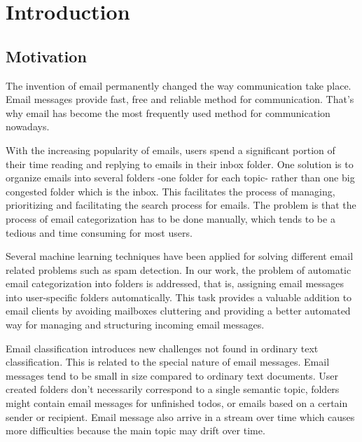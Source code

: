 
\chapter{Introduction} %

\label{Chapter1} %


\section{Motivation}

The invention of email permanently changed the way communication take place. 
Email messages provide fast, free and reliable method for communication. 
That's why email has become the most frequently used method for communication 
nowadays.

With the increasing popularity of emails, users spend a significant portion of 
their time reading and replying to emails in their inbox folder. One solution 
is to organize emails into several folders -one folder for each topic- rather 
than one big congested folder which is the inbox. This facilitates the process 
of managing, prioritizing and facilitating the search process for emails. 
The problem is that the process of email categorization has to be done manually, 
which tends to be a tedious and time consuming for most users.

Several machine learning techniques have been applied for solving different 
email related problems such as spam detection. In our work, the problem of 
automatic email categorization into folders is addressed, that is, assigning 
email messages into user-specific folders automatically. This task provides 
a valuable addition to email clients by avoiding mailboxes cluttering and 
providing a better automated way for managing and structuring incoming email 
messages.

Email classification introduces new challenges not found in ordinary text 
classification. This is related to the special nature of email messages. Email 
messages tend to be small in size compared to ordinary text documents. User 
created folders don't necessarily correspond to a single semantic topic, 
folders might contain email messages for unfinished todos, or emails based on 
a certain sender or recipient. Email message also arrive in a stream over time 
which causes more difficulties because the main topic may drift over time.

